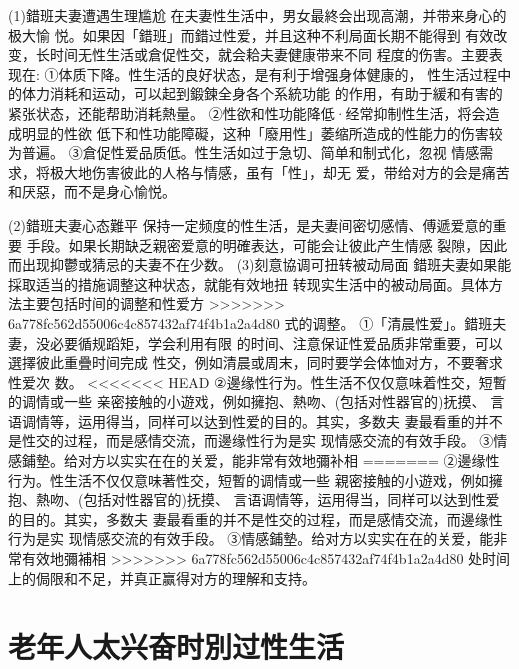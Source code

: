 \documentclass[12pt,UTF8]{ctexbook}
\begin{document}
(1)錯班夫妻遭遇生理尴尬
在夫妻性生活中，男女最終会出现高潮，并带来身心的极大愉
悦。如果因「錯班」而錯过性爱，并且这种不利局面长期不能得到
有效改变，长时间无性生活或倉促性交，就会耠夫妻健康带来不同
程度的伤害。主要表现在:
①体质下降。性生活的良好状态，是有利于增强身体健康的，
性生活过程中的体力消耗和运动，可以起到鍛鍊全身各个系統功能
的作用，有助于緩和有害的紧张状态，还能帮助消耗熱量。
②性欲和性功能降低·经常抑制性生活，将会造成明显的性欲
低下和性功能障礙，这种「廢用性」萎缩所造成的性能力的伤害较
为普遍。
③倉促性爱品质低。性生活如过于急切、简单和制式化，忽视
情感需求，将极大地伤害彼此的人格与情感，虽有「性」，却无
爱，带给对方的会是痛苦和厌惡，而不是身心愉悦。

(2)錯班夫妻心态難平
保持一定频度的性生活，是夫妻间密切感情、傅遞爱意的重要
手段。如果长期缺乏親密爱意的明確表达，可能会让彼此产生情感
裂隙，因此而出现抑鬱或猜忌的夫妻不在少数。
(3)刻意協调可扭转被动局面
錯班夫妻如果能採取适当的措施调整这种状态，就能有效地扭
转现实生活中的被动局面。具体方法主要包括时间的调整和性爱方
>>>>>>> 6a778fc562d55006c4c857432af74f4b1a2a4d80
式的调整。
①「清晨性爱」。錯班夫妻，没必要循规蹈矩，学会利用有限
的时间、注意保证性爱品质非常重要，可以選擇彼此重疊时间完成
性交，例如清晨或周末，同时要学会体恤对方，不要奢求性爱次
数。
<<<<<<< HEAD
②邊缘性行为。性生活不仅仅意味着性交，短暫的调情或一些
亲密接触的小遊戏，例如擁抱、熱吻、(包括对性器官的)抚摸、
言语调情等，运用得当，同样可以达到性爱的目的。其实，多数夫
妻最看重的并不是性交的过程，而是感情交流，而邊缘性行为是实
现情感交流的有效手段。
③情感鋪墊。给对方以实实在在的关爱，能非常有效地彌补相
=======
②邊缘性行为。性生活不仅仅意味著性交，短暫的调情或一些
親密接触的小遊戏，例如擁抱、熱吻、(包括对性器官的)抚摸、
言语调情等，运用得当，同样可以达到性爱的目的。其实，多数夫
妻最看重的并不是性交的过程，而是感情交流，而邊缘性行为是实
现情感交流的有效手段。
③情感鋪墊。给对方以实实在在的关爱，能非常有效地彌補相
>>>>>>> 6a778fc562d55006c4c857432af74f4b1a2a4d80
处时间上的侷限和不足，并真正赢得对方的理解和支持。


\section{老年人太兴奋时別过性生活}
\end{document}
